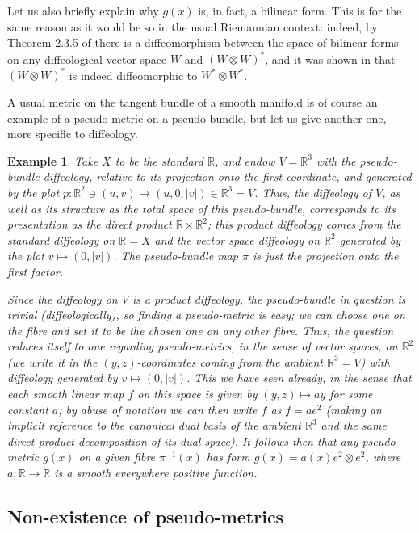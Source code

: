 \documentclass{article}
\newtheorem{example}[lemma]{Example}
\newcommand\matR{{\mathbb{R}}}
\begin{document}
Let us also briefly explain why $g(x)$ is, in fact, a bilinear form. This is for the same reason as it would be so in the usual Riemannian context: indeed, by Theorem 2.3.5 of \cite{vincent} there is a 
diffeomorphism between the space of bilinear forms on any diffeological vector space $W$ and $(W\otimes W)^*$, and it was shown in \cite{multilinear} that $(W\otimes W)^*$ is indeed diffeomorphic to 
$W^*\otimes W^*$.

A usual metric on the tangent bundle of a smooth manifold is of course an example of a pseudo-metric on a pseudo-bundle, but let us give another one, more specific to diffeology.

\begin{example}
Take $X$ to be the standard $\matR$, and endow $V=\matR^3$ with the pseudo-bundle diffeology, relative to its projection onto the first coordinate, and generated by the plot
$p:\matR^2\ni(u,v)\mapsto(u,0,|v|)\in\matR^3=V$. Thus, the diffeology of $V$, as well as its structure as the total space of this pseudo-bundle, corresponds to its presentation as the direct product 
$\matR\times\matR^2$; this product diffeology comes from the standard diffeology on $\matR=X$ and the vector space diffeology on $\matR^2$ generated by the plot $v\mapsto(0,|v|)$. The pseudo-bundle
map $\pi$ is just the projection onto the first factor.

Since the diffeology on $V$ is a product diffeology, the pseudo-bundle in question is trivial (diffeologically), so finding a pseudo-metric is easy; we can choose one on the fibre and set it to be the chosen one 
on any other fibre. Thus, the question reduces itself to one regarding pseudo-metrics, in the sense of vector spaces, on $\matR^2$ (we write it in the $(y,z)$-coordinates coming from the ambient $\matR^3=V$) 
with diffeology generated by $v\mapsto(0,|v|)$. This we have seen already, in the sense that each smooth linear map $f$ on this space is given by $(y,z)\mapsto ay$ for some constant $a$; by abuse of notation 
we can then write $f$ as $f=ae^2$ (making an implicit reference to the canonical dual basis of the ambient $\matR^3$ and the same direct product decomposition of its dual space). It follows then that any 
pseudo-metric $g(x)$ on a given fibre $\pi^{-1}(x)$ has form $g(x)=a(x)e^2\otimes e^2$, where $a:\matR\to\matR$ is a smooth everywhere positive function.
\end{example}


\subsection{Non-existence of pseudo-metrics}
\end{document}
